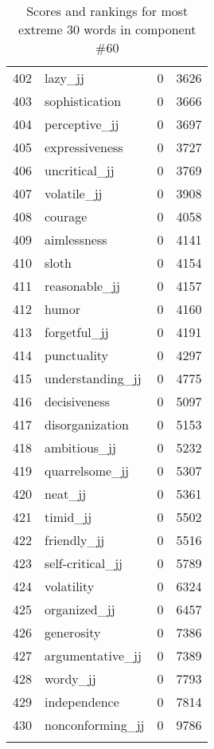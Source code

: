 \begin{longtable}[!htbp]{| rlr@{.}l |}
    402 & lazy\_jj & 0 & 3626 \\
    403 & sophistication & 0 & 3666 \\
    404 & perceptive\_jj & 0 & 3697 \\
    405 & expressiveness & 0 & 3727 \\
    406 & uncritical\_jj & 0 & 3769 \\
    407 & volatile\_jj & 0 & 3908 \\
    408 & courage & 0 & 4058 \\
    409 & aimlessness & 0 & 4141 \\
    410 & sloth & 0 & 4154 \\
    411 & reasonable\_jj & 0 & 4157 \\
    412 & humor & 0 & 4160 \\
    413 & forgetful\_jj & 0 & 4191 \\
    414 & punctuality & 0 & 4297 \\
    415 & understanding\_jj & 0 & 4775 \\
    416 & decisiveness & 0 & 5097 \\
    417 & disorganization & 0 & 5153 \\
    418 & ambitious\_jj & 0 & 5232 \\
    419 & quarrelsome\_jj & 0 & 5307 \\
    420 & neat\_jj & 0 & 5361 \\
    421 & timid\_jj & 0 & 5502 \\
    422 & friendly\_jj & 0 & 5516 \\
    423 & self-critical\_jj & 0 & 5789 \\
    424 & volatility & 0 & 6324 \\
    425 & organized\_jj & 0 & 6457 \\
    426 & generosity & 0 & 7386 \\
    427 & argumentative\_jj & 0 & 7389 \\
    428 & wordy\_jj & 0 & 7793 \\
    429 & independence & 0 & 7814 \\
    430 & nonconforming\_jj & 0 & 9786 \\
    \hline
    \caption{Scores and rankings for most extreme 30 words in component \#60} \\
\end{longtable}
